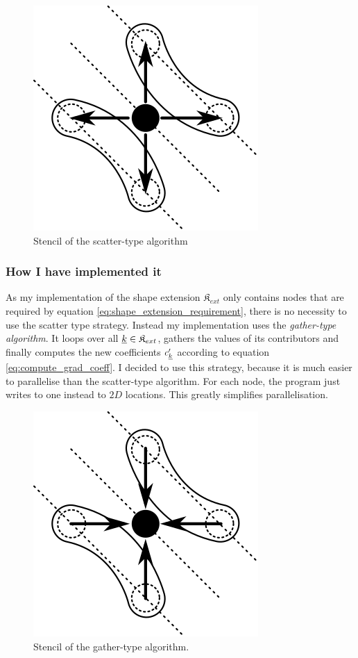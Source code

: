 \documentclass{article}
\begin{document}
\begin{figure}[H]
  \centering
  \includegraphics{grad_scatter_stencil}
  \caption{Stencil of the scatter-type algorithm}
  \label{fig:grad_scatter_stencil}
\end{figure}

\subsubsection{How I have implemented it}
As my implementation of the shape extension \(\mathfrak{K}_{ext}\) only contains
nodes that are required by equation \eqref{eq:shape_extension_requirement},
there is no necessity to use the scatter type strategy.
Instead my implementation uses the \emph{gather-type algorithm}. It loops over all
\(\underline{k} \in \mathfrak{K}_{ext}\), gathers the values of its contributors
and finally computes the new coefficients \(c'_{\underline{k}}\) according to equation
\eqref{eq:compute_grad_coeff}.
I decided to use this strategy, because it is much easier to parallelise than the
scatter-type algorithm.
For each node, the program just writes to one instead to \(2D\) locations.
This greatly simplifies parallelisation.

\begin{figure}[H]
  \centering
  \includegraphics{grad_gather_stencil}
  \caption{Stencil of the gather-type algorithm.}
  \label{fig:grad_gather_stencil}
\end{figure}
\end{document}
